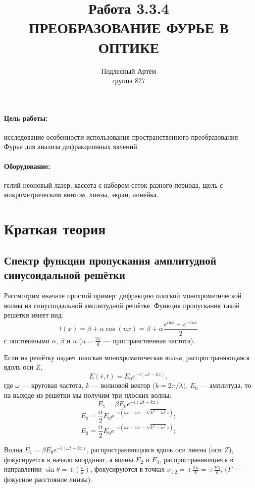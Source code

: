 \documentclass[a4paper, 14pt]{extarticle}%
\author{Подлесный Артём \\ группа 827}
\title{Работа 3.3.4 \\ ПРЕОБРАЗОВАНИЕ ФУРЬЕ В ОПТИКЕ}
\begin{document}
\maketitle

\paragraph*{Цель работы:} исследование особенности использования пространственного преобразования Фурье для анализа дифракционных явлений.
\paragraph*{Оборудование:} гелий-неоновый лазер, кассета с набором
сеток разного периода, щель с микрометрическим винтом, линзы,
экран, линейка.

\section*{Краткая теория}

\subsection*{Спектр функции пропускания амплитудной синусоидальной решётки}

Рассмотрим вначале простой пример: дифракцию плоской монохроматической волны на синусоидальной амплитудной решётке. Функция пропускания такой решётки имеет
вид:
\[t(x) = \beta+\alpha\cos(ux)=\beta+\alpha\frac{e^{iux}+e^{-iux}}{2}\]
с постоянными $ \alpha $, $ \beta$ и $ u $ ($ u = \frac{2\pi}{d} $ — пространственная частота).

Если на решётку падает плоская монохроматическая волна, распространяющаяся вдоль оси $Z$,
\[E(\overline{r}, t) = E_0 e^{-i(\omega t-kz)},\]
где $  \omega$ — круговая частота, $k$ — волновой вектор ($k = 2\pi/\lambda)$, $E_0$ — амплитуда, то на выходе из решётки мы получим три плоских волны:
\[E_1 = \beta E_0 e^{-i(\omega t-kz)}\]
\[E_2 = \frac{\alpha}{2} E_0 e^{-i(\omega t-ux-\sqrt{k^2-u^2}z)};\]
\[E_3 = \frac{\alpha}{2} E_0 e^{-i(\omega t+ux-\sqrt{k^2-u^2}z)};\]

Волна $ E_1 = \beta E_0 e^{-i(\omega t-kz)} $, распространяющаяся вдоль оси линзы (оси $Z$), фокусируется в начало
координат, а волны
$E_2$ и $E_3$, распространяющиеся в направлении  $\sin \theta = \pm (\frac{u}{k})$, фокусируются в точках  $x_{\text{1,2}} = \pm \frac{Fu}{k} = \pm \frac{F\lambda}{k}$, ($F$ — фокусное расстояние линзы).
\end{document}
